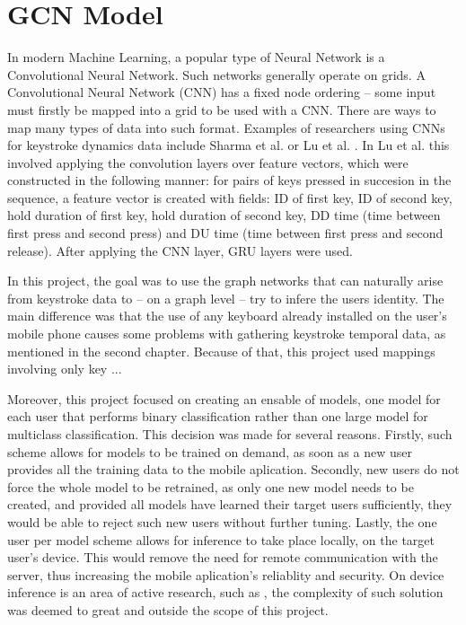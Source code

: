 \chapter{GCN Model}

In modern Machine Learning, a popular type of Neural Network is a Convolutional Neural Network. Such networks generally operate on grids. A Convolutional Neural Network (CNN) has a fixed node ordering -- some input must firstly be mapped into a grid to be used with a CNN. There are ways to map many types of data into such format. Examples of researchers using CNNs for keystroke dynamics data include Sharma et al. \cite{Shar2023} or Lu et al. \cite{Lu2020}. In Lu et al. this involved applying the convolution layers over feature vectors, which were constructed in the following manner: for pairs of keys pressed in succesion in the sequence, a feature vector is created with fields: ID of first key, ID of second key, hold duration of first key, hold duration of second key, DD time (time between first press and second press) and DU time (time between first press and second release). After applying the CNN layer, GRU layers were used.

In this project, the goal was to use the graph networks that can naturally arise from keystroke data to -- on a graph level -- try to infere the users identity. The main difference was that the use of any keyboard already installed on the user's mobile phone causes some problems with gathering keystroke temporal data, as mentioned in the second chapter. Because of that, this project used mappings involving only key ...

Moreover, this project focused on creating an ensable of models, one model for each user that performs binary classification rather than one large model for multiclass classification. This decision was made for several reasons. Firstly, such scheme allows for models to be trained on demand, as soon as a new user provides all the training data to the mobile aplication. Secondly, new users do not force the whole model to be retrained, as only one new model needs to be created, and provided all models have learned their target users sufficiently, they would be able to reject such new users without further tuning. Lastly, the one user per model scheme allows for inference to take place locally, on the target user's device. This would remove the need for remote communication with the server, thus increasing the mobile aplication's reliablity and security. On device inference is an area of active research, such as , the complexity of such solution was deemed to great and outside the scope of this project.